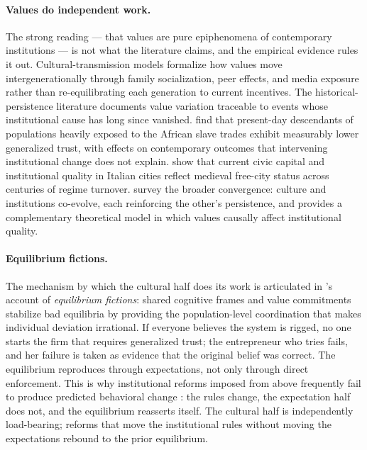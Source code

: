 \documentclass{article}
\theoremstyle{plain}
\theoremstyle{definition}
\theoremstyle{remark}
\begin{document}
\paragraph{Values do independent work.} The strong reading --- that values are pure epiphenomena of contemporary institutions --- is not what the literature claims, and the empirical evidence rules it out. Cultural-transmission models \citep{bisin2001economics} formalize how values move intergenerationally through family socialization, peer effects, and media exposure rather than re-equilibrating each generation to current incentives. The historical-persistence literature documents value variation traceable to events whose institutional cause has long since vanished. \citet{nunnwantchekon2011} find that present-day descendants of populations heavily exposed to the African slave trades exhibit measurably lower generalized trust, with effects on contemporary outcomes that intervening institutional change does not explain. \citet{guiso2016long} show that current civic capital and institutional quality in Italian cities reflect medieval free-city status across centuries of regime turnover. \citet{alesina2015culture} survey the broader convergence: culture and institutions co-evolve, each reinforcing the other's persistence, and \citet{tabellini2008institutions} provides a complementary theoretical model in which values causally affect institutional quality.

\paragraph{Equilibrium fictions.} The mechanism by which the cultural half does its work is articulated in \citet{hoffstiglitz2010, hoffstiglitz2016striving}'s account of \emph{equilibrium fictions}: shared cognitive frames and value commitments stabilize bad equilibria by providing the population-level coordination that makes individual deviation irrational. If everyone believes the system is rigged, no one starts the firm that requires generalized trust; the entrepreneur who tries fails, and her failure is taken as evidence that the original belief was correct. The equilibrium reproduces through expectations, not only through direct enforcement. This is why institutional reforms imposed from above frequently fail to produce predicted behavioral change \citep{greif2006institutions}: the rules change, the expectation half does not, and the equilibrium reasserts itself. The cultural half is independently load-bearing; reforms that move the institutional rules without moving the expectations rebound to the prior equilibrium.
\end{document}
